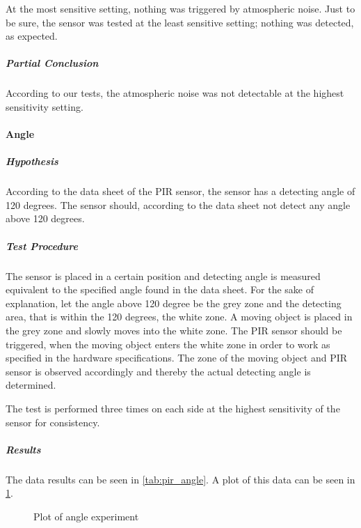At the most sensitive setting, nothing was triggered by atmospheric noise. Just
to be sure, the sensor was tested at the least sensitive setting; nothing was
detected, as expected.

\subparagraph{Partial Conclusion}
\label{subp:SenPartial Conclusion}

According to our tests, the atmospheric noise was not detectable at the highest
sensitivity setting.

\paragraph{Angle}
\label{par:Angle}

\subparagraph{Hypothesis}
\label{subp:AngHypothesis}
According to the data sheet of the PIR sensor,
the sensor has a detecting angle of 120 degrees.
The sensor should, according to the data sheet not detect any angle above 120 degrees.

\subparagraph{Test Procedure}
\label{subp:AngTest Procedure}
The sensor is placed in a certain position and detecting angle is measured equivalent to
the specified angle found in the data sheet.
For the sake of explanation, let the angle above 120 degree be the grey zone and
the detecting area, that is within the 120 degrees, the white zone.
A moving object is placed in the grey zone and slowly moves into the white zone.
The PIR sensor should be triggered, when the moving object enters the white zone in order
to work as specified in the hardware specifications.
The zone of the moving object and PIR sensor is observed accordingly
and thereby the actual detecting angle is determined.

The test is performed three times on each side at the highest sensitivity of the sensor for consistency.

\subparagraph{Results}
\label{subp:AngResults}

The data results can be seen in \cref{tab:pir_angle}. A plot of this data can be
seen in \cref{fig:pir_angle}.

\begin{figure}[htbp]
\centering
{}
\caption[Angle experiment]{Plot of angle experiment}\label{fig:pir_angle}
\end{figure}

